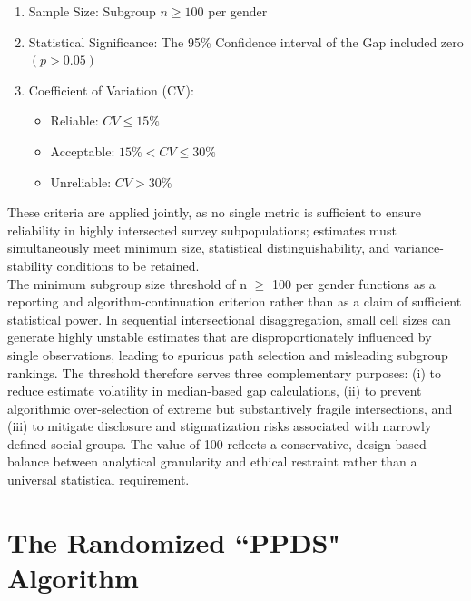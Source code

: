 \documentclass{article}
\begin{document}
\begin{enumerate}

    \item Sample Size: Subgroup $n \geq 100$ 
    per gender

    \item Statistical Significance: The 95\% 
    Confidence interval of the Gap included 
    zero $(p>0.05)$

    \item Coefficient of Variation (CV): 
    \begin{itemize}

        \item Reliable: 
        $CV \leq 15\%$

        \item Acceptable: 
        $15\% < CV \leq 30\%$

        \item Unreliable: 
        $CV > 30\%$

    \end{itemize}
\end{enumerate}
These criteria are applied jointly, as no single metric is sufficient to ensure reliability in 
highly intersected survey subpopulations; estimates must simultaneously meet minimum size, 
statistical distinguishability, and variance-stability conditions to be retained. \\
The minimum subgroup size threshold of n $\geq$ 100 per gender functions as a reporting and 
algorithm-continuation criterion rather than as a claim of sufficient statistical power. In 
sequential intersectional disaggregation, small cell sizes can generate highly unstable estimates 
that are disproportionately influenced by single observations, leading to spurious path selection 
and misleading subgroup rankings. The threshold therefore serves three complementary purposes: 
(i) to reduce estimate volatility in median-based gap calculations, (ii) to prevent algorithmic 
over-selection of extreme but substantively fragile intersections, and (iii) to mitigate disclosure 
and stigmatization risks associated with narrowly defined social groups. The value of 100 reflects 
a conservative, design-based balance between analytical granularity and ethical restraint rather 
than a universal statistical requirement.

\section{The Randomized ``PPDS" Algorithm}
\end{document}
